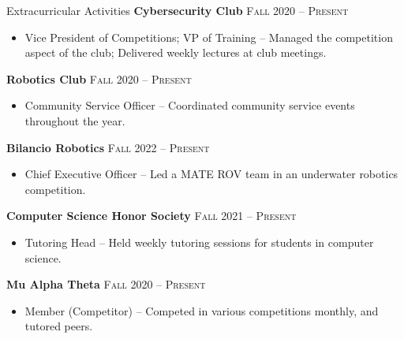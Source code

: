 \begin{resume_section}{Extracurricular Activities}
	\textbf{Cybersecurity Club} \hspace*{\fill} \textsc{Fall 2020 -- Present}

	\begin{itemize}
		\setlength{\labelsep}{0.1in}
		\item Vice President of Competitions; VP of Training -- Managed the competition aspect of the club; Delivered weekly lectures at club meetings.
	\end{itemize}

	\textbf{Robotics Club} \hspace*{\fill} \textsc{Fall 2020 -- Present}

	\begin{itemize}
		\setlength{\labelsep}{0.1in}
		\item Community Service Officer -- Coordinated community service events throughout the year.
	\end{itemize}

	\textbf{Bilancio Robotics} \hspace*{\fill} \textsc{Fall 2022 -- Present}

	\begin{itemize}
		\setlength{\labelsep}{0.1in}
		\item Chief Executive Officer -- Led a MATE ROV team in an underwater robotics competition.
	\end{itemize}

	\textbf{Computer Science Honor Society} \hspace*{\fill} \textsc{Fall 2021 -- Present}

	\begin{itemize}
		\setlength{\labelsep}{0.1in}
		\item Tutoring Head -- Held weekly tutoring sessions for students in computer science.
	\end{itemize}

	\textbf{Mu Alpha Theta} \hspace*{\fill} \textsc{Fall 2020 -- Present}

	\begin{itemize}
		\setlength{\labelsep}{0.1in}
		\item Member (Competitor) -- Competed in various competitions monthly, and tutored peers. 
	\end{itemize}
\end{resume_section}

\medskip

